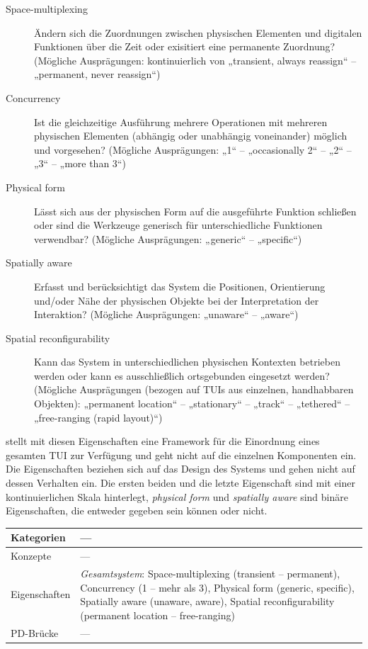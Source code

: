 \begin{description}
	\item[Space-multiplexing] Ändern sich die Zuordnungen zwischen physischen Elementen und digitalen Funktionen über die Zeit oder exisitiert eine permanente Zuordnung? (Mögliche Ausprägungen: kontinuierlich von „transient, always reassign“ -- „permanent, never reassign“)
	\item[Concurrency] Ist die gleichzeitige Ausführung mehrere Operationen mit mehreren physischen Elementen (abhängig oder unabhängig voneinander) möglich und vorgesehen? (Mögliche Ausprägungen: „1“ -- „occasionally 2“ -- „2“ -- „3“ -- „more than 3“)
	\item[Physical form] Lässt sich aus der physischen Form auf die ausgeführte Funktion schließen oder sind die Werkzeuge generisch für unterschiedliche Funktionen verwendbar? (Mögliche Ausprägungen: „generic“ -- „specific“) 
	\item[Spatially aware] Erfasst und berücksichtigt das System die Positionen, Orientierung und/oder Nähe der physischen Objekte bei der Interpretation der Interaktion? (Mögliche Ausprägungen: „unaware“ -- „aware“)
	\item[Spatial reconfigurability] Kann das System in unterschiedlichen physischen Kontexten betrieben werden oder kann es ausschließlich ortsgebunden eingesetzt werden? (Mögliche Ausprägungen (bezogen auf \glspl{TUI} aus einzelnen, handhabbaren Objekten): „permanent location“ -- „stationary“ -- „track“ -- „tethered“ -- „free-ranging (rapid layout)“)
\end{description}

\citeauthor{Fitzmaurice96} stellt mit diesen Eigenschaften eine Framework für die Einordnung eines gesamten \gls{TUI} zur Verfügung und geht nicht auf die einzelnen Komponenten ein. Die Eigenschaften beziehen sich auf das Design des Systems und gehen nicht auf dessen Verhalten ein. Die ersten beiden und die letzte Eigenschaft sind mit einer kontinuierlichen Skala hinterlegt, \emph{physical form} und \emph{spatially aware} sind binäre Eigenschaften, die entweder gegeben sein können oder nicht.

\begin{tabular}{| p{3cm} | p{10cm} |}
  \hline
  Kategorien & --- \\ \hline
  Konzepte & --- \\ \hline
  Eigenschaften & \emph{Gesamtsystem}: Space-multiplexing (transient -- permanent), Concurrency (1 -- mehr als 3), Physical form (generic, specific), Spatially aware (unaware, aware), Spatial reconfigurability (permanent location -- free-ranging) \\ \hline
  PD-Brücke & --- \\ \hline
\end{tabular} 

